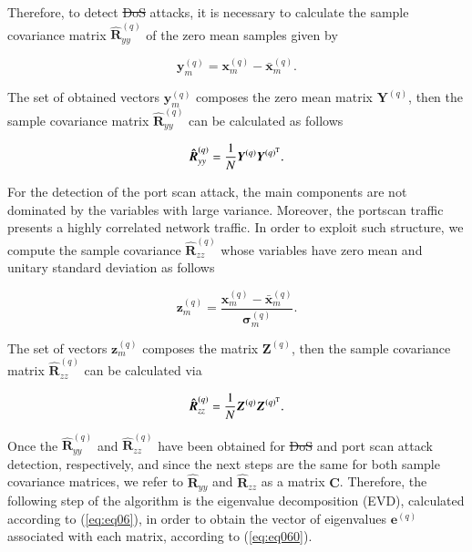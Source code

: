 \documentclass[review]{elsarticle}
\providecommand{\DIFaddtex}[1]{{\protect\color{blue}\uwave{#1}}} %
\providecommand{\DIFdeltex}[1]{{\protect\color{red}\sout{#1}}}                      %
\providecommand{\DIFaddbegin}{} %
\providecommand{\DIFaddend}{} %
\providecommand{\DIFdelbegin}{} %
\providecommand{\DIFdelend}{} %
\providecommand{\DIFadd}[1]{\texorpdfstring{\DIFaddtex{#1}}{#1}} %
\providecommand{\DIFdel}[1]{\texorpdfstring{\DIFdeltex{#1}}{}} %
\begin{document}
Therefore, to detect \DIFdelbegin \DIFdel{DoS }\DIFdelend \DIFaddbegin \DIFadd{flood }\DIFaddend attacks, it is necessary to calculate the sample covariance matrix $\boldsymbol{\hat{R}}_{yy}^{(q)}$ of the zero mean samples given by

\begin{equation}\label{eq:eq02}
\boldsymbol{y}_{m}^{(q)} = \boldsymbol{x}_{m}^{(q)} - \bar{\boldsymbol{x}}_{m}^{(q)}.
\end{equation}

The set of obtained vectors $\boldsymbol{y}_{m}^{(q)}$ composes the zero mean matrix $\boldsymbol{Y}^{(q)}$, then the sample covariance matrix $\boldsymbol{\hat{R}}_{yy}^{(q)}$ can be calculated as follows

\begin{equation}\label{eq:eq03}
\boldsymbol{\hat{R}}_{yy}^{(q)} = \frac{1}{N}\boldsymbol{Y}^{(q)}\boldsymbol{Y}^{(q)^{\rm T}}.
\end{equation}

For the detection of the port scan attack, the main components are not dominated by the variables with large variance. Moreover, the portscan traffic presents a highly correlated network traffic. In order to exploit such structure, we compute the sample covariance $\boldsymbol{\hat{R}}_{zz}^{(q)}$ whose variables have zero mean and unitary standard deviation as follows

\begin{equation}\label{eq:eq04}
\boldsymbol{z}_{m}^{(q)} = \frac{\boldsymbol{x}_{m}^{(q)} - \bar{\boldsymbol{x}}_{m}^{(q)}}{\boldsymbol{\sigma}_{m}^{(q)}}.
\end{equation}

The set of vectors $\boldsymbol{z}_{m}^{(q)}$ composes the matrix $\boldsymbol{Z}^{(q)}$, then the sample covariance matrix $\boldsymbol{\hat{R}}_{zz}^{(q)}$ can be calculated via 

\begin{equation}\label{eq:eq05}
\boldsymbol{\hat{R}}_{zz}^{(q)} = \frac{1}{N}\boldsymbol{Z}^{(q)}\boldsymbol{Z}^{(q)^{\rm T}}.
\end{equation}

Once the $\boldsymbol{\hat{R}}_{yy}^{(q)}$ and $\boldsymbol{\hat{R}}_{zz}^{(q)}$ have been obtained for \DIFdelbegin \DIFdel{DoS }\DIFdelend \DIFaddbegin \DIFadd{flood }\DIFaddend and port scan attack detection, respectively, and since the next steps are the same for both sample covariance matrices, we refer to $\boldsymbol{\hat{R}}_{yy}$ and $\boldsymbol{\hat{R}}_{zz}$ as a matrix $\boldsymbol{C}$. Therefore, the following step of the algorithm is the eigenvalue decomposition (EVD), calculated according to (\ref{eq:eq06}), in order to obtain the vector of eigenvalues $\boldsymbol{e}^{(q)}$ associated with each matrix, according to (\ref{eq:eq060}).
\end{document}
